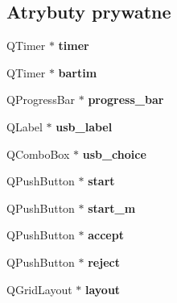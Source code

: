 \subsection*{Atrybuty prywatne}
\begin{DoxyCompactItemize}
\item 
Q\+Timer $\ast$ {\bfseries timer}\hypertarget{class_okno_a0ca5cf439ed8ad3ab7ef7b854c267f1b}{}\label{class_okno_a0ca5cf439ed8ad3ab7ef7b854c267f1b}

\item 
Q\+Timer $\ast$ {\bfseries bartim}\hypertarget{class_okno_a0c69b007d741152d74b5d3d498289a48}{}\label{class_okno_a0c69b007d741152d74b5d3d498289a48}

\item 
Q\+Progress\+Bar $\ast$ {\bfseries progress\+\_\+bar}\hypertarget{class_okno_aebc2e861da784f50f7965b17cfd8a85e}{}\label{class_okno_aebc2e861da784f50f7965b17cfd8a85e}

\item 
Q\+Label $\ast$ {\bfseries usb\+\_\+label}\hypertarget{class_okno_a69cde4a1b1adcb98dd0f74b4a27a13e8}{}\label{class_okno_a69cde4a1b1adcb98dd0f74b4a27a13e8}

\item 
Q\+Combo\+Box $\ast$ {\bfseries usb\+\_\+choice}\hypertarget{class_okno_ae069d59c53771223e2c82d6d6ace45d3}{}\label{class_okno_ae069d59c53771223e2c82d6d6ace45d3}

\item 
Q\+Push\+Button $\ast$ {\bfseries start}\hypertarget{class_okno_ae7cda77331e084b73b3065c4cc5e46d2}{}\label{class_okno_ae7cda77331e084b73b3065c4cc5e46d2}

\item 
Q\+Push\+Button $\ast$ {\bfseries start\+\_\+m}\hypertarget{class_okno_a211a0bea332494946d0417ebb6c73ae3}{}\label{class_okno_a211a0bea332494946d0417ebb6c73ae3}

\item 
Q\+Push\+Button $\ast$ {\bfseries accept}\hypertarget{class_okno_a4fe774bd293a9dd438b803279b1cdd3a}{}\label{class_okno_a4fe774bd293a9dd438b803279b1cdd3a}

\item 
Q\+Push\+Button $\ast$ {\bfseries reject}\hypertarget{class_okno_a70bd37b785ed16ce6db16f5b434ab75a}{}\label{class_okno_a70bd37b785ed16ce6db16f5b434ab75a}

\item 
Q\+Grid\+Layout $\ast$ {\bfseries layout}\hypertarget{class_okno_a00ebd56e108eee1419ef68f9f68bfce3}{}\label{class_okno_a00ebd56e108eee1419ef68f9f68bfce3}


\end{DoxyCompactItemize}
